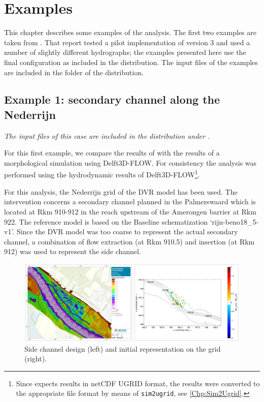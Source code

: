 \chapter{Examples}

This chapter describes some examples of the \dfmi analysis.
The first two examples are taken from \citet{GiriJagers2022}.
That report tested a pilot implementation of \dfmi version 3 and used a number of slightly different hydrographs; the examples presented here use the final configuration as included in the \dfmi distribution.
The input files of the examples are included in the  folder of the \dfmi distribution.

\section{Example 1: secondary channel along the Nederrijn}

\emph{The input files of this case are included in the distribution under .}

For this first example, we compare the results of \dfastmi with the results of a morphological simulation using Delft3D-FLOW.
For consistency the \dfastmi analysis was performed using the hydrodynamic results of Delft3D-FLOW\footnote{Since \dfastmi expects \dflowfm results in netCDF UGRID format, the results were converted to the appropriate file format by means of \texttt{sim2ugrid}, see \autoref{Chp:Sim2Ugrid}.}.

For this analysis, the Nederrijn grid of the DVR model has been used.
The intervention concerns a secondary channel planned in the Palmerswaard which is located at Rkm 910-912 in the reach upstream of the Amerongen barrier at Rkm 922.
The reference model is based on the Baseline schematization ‘rijn-beno18\_5-v1’.
Since the DVR model was too coarse to represent the actual secondary channel, a combination of flow extraction (at Rkm 910.5) and insertion (at Rkm 912) was used to represent the side channel.

\begin{figure}
\includegraphics[width=\columnwidth]{figures/Palmerswaard_proj.png}
\caption{Side channel design (left) and initial representation on the grid (right).}
\label{Palmers_proj}
\end{figure}

